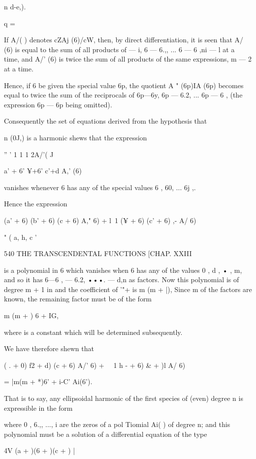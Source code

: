 n  d-e,). 

q = \ 

If A/( ) denotes cZAj (6)/cW, then, by direct differentiation, it is seen that 
A/ (6) is equal to the sum of all products of   —  i, 6 — 6.,, ... 6 — 6 ,ni — l at 
a time, and A/' (6) is twice the sum of all products of the same expressions, 
m — 2 at a time. 

Hence, if 6 be given the special value 6p, the quotient A " (6p)IA  (6p) 
becomes equal to twice the sum of the reciprocals of 6p—6y, 6p — 6.2, ... 6p — 6 , 
(the expression 6p — 6p being omitted). 

Consequently the set of equations derived from the hypothesis that 

n (0J,) is a harmonic shews that the expression 

'' ' 1 1 1 2A/'( J 

a' + 6'  ¥+6'  c'+d  A,' (6) 

vanishes whenever 6 has any of the special values 6 , 60, ... 6j ,. 

Hence the expression 

(a' + 6) (b' + 6) (c  + 6) A,"  6) + l\ 1 (¥ + 6) (c' + 6) ,- A/  6) 

" ( a, h, c ' 



540 THE TRANSCENDENTAL FUNCTIONS [CHAP. XXIII 

is a polynomial in 6 which vanishes when 6 has any of the values 0 , d , •   ,  m, 
and so it has 6—6 , — 6.2, •••. — d,n as factors. Now this polynomial is of 
degree m + 1 in   and the coefficient of  '"+  is m (m + |), Since m of the 
factors are known, the remaining factor must be of the form 

m (m +  ) 6 + IG, 

where is a constant which will be determined subsequently. 

We have therefore shewn that 

( . + 0)  f2 + d) (c  + 6) A/'  6) + \ \  1  h - + 6)  \& +  )l A/  6) 

= |m(m + *)6' + i-C' Ai(6'). 

That is to say, any ellipsoidal harmonic of the first species of (even) 
degree n is expressible in the form 

where 0 , 6.,, ...,  i  are the zeros of a pol Tiomial Ai( ) of degree  n; and 
this polynomial must be a solution of a differential equation of the type 



4V (a + )(6  +  )(c  +  ) |  



